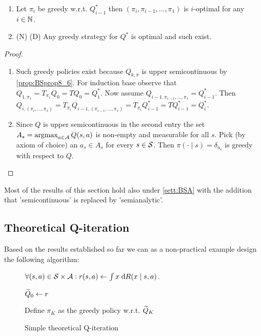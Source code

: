 \begin{prop}
  \leavevmode
  \begin{enumerate}
    \item Let $\pi_i$ be greedy w.r.t. $Q_{i-1}^*$ then
      $(\pi_i, \pi_{i-1}, \dots, \pi_1)$ is $i$-optimal for any $i \in \mathbb{N}$.
    \item (N) (D) Any greedy strategy for $Q^*$ is optimal and such exist.
  \end{enumerate}
\end{prop}
\begin{proof}
  \begin{enumerate}
    \item Such greedy policies exist because $Q_{k, \pi}$ is upper
      semicontinuous by \cref{prop:BSprop8_6}.
      For induction base observe that
      $ Q_{1, \pi_1} = T_{\pi_1} Q_0 = T Q_0 = Q_1^*$.
      Now assume $Q_{i-1, {\pi_{i-1}, \dots, \pi_1}} = Q^*_{i-1}$.
      Then
      $Q_{i, (\pi_i, \dots, \pi_1)}
      = T_{\pi_i} Q_{i-1, (\pi_{i-1}, \dots, \pi_1)}
      = T_{\pi_i} Q^*_{i-1} = T Q_{i-1}^* = Q_i^*$.
    \item Since $Q$ is upper semicontinuous in the second entry
      the set $A_s = \operatorname*{argmax}_{a \in \mathcal{A}} Q(s, a)$ is non-empty
      and measurable for all $s$.
      Pick (by axiom of choice) an $a_s \in A_s$ for every $s \in \mathcal{S}$.
      Then $\pi(\cdot \mid s) = \delta_{a_s}$ is greedy with respect to $Q$.
  \end{enumerate}
\end{proof}

\begin{rem}
  Most of the results of this section hold
  also under \cref{sett:BSA} with the addition
  that 'semicontinuous' is replaced by 'semianalytic'.
\end{rem}

\subsection{Theoretical Q-iteration}

Based on the results established so far we can as a non-practical
example design the following algorithm:

\begin{figure}[H]
\begin{algorithm}[H] %
\caption{Simple theoretical Q-iteration}
$\forall (s, a) \in \mathcal{S} \times \mathcal{A} :
r(s, a) \leftarrow \int x \; \mathrm{d} R(x \mid s, a)$.

$\widetilde{Q}_0 \leftarrow r$

Define $\pi_K$ as the greedy policy w.r.t. $\widetilde{Q}_K$ \\
\label{alg:theoSimpleQ}
\end{algorithm}
\end{figure}

